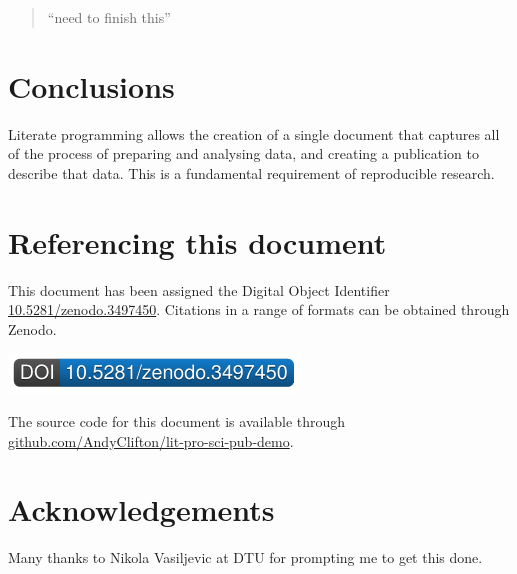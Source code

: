 \documentclass[11pt,]{article}
\begin{document}
\begin{quote}
``need to finish this''
\end{quote}

\hypertarget{conclusions}{%
\section{Conclusions}\label{conclusions}}

Literate programming allows the creation of a single document that captures all of the process of preparing and analysing data, and creating a publication to describe that data. This is a fundamental requirement of reproducible research.

\hypertarget{referencing-this-document}{%
\section*{Referencing this document}\label{referencing-this-document}}

This document has been assigned the Digital Object Identifier \href{http://dx.doi.org/10.5281/zenodo.3497450}{10.5281/zenodo.3497450}. Citations in a range of formats can be obtained through Zenodo.

\href{https://doi.org/10.5281/zenodo.3497450}{\includegraphics{DOIBadge3497450.pdf}}

The source code for this document is available through \href{https://github.com/AndyClifton/lit-pro-sci-pub-demo}{github.com/AndyClifton/lit-pro-sci-pub-demo}.

\hypertarget{acknowledgements}{%
\section*{Acknowledgements}\label{acknowledgements}}

Many thanks to Nikola Vasiljevic at DTU for prompting me to get this done.

\renewcommand\refname{Bibliography}

\end{document}
